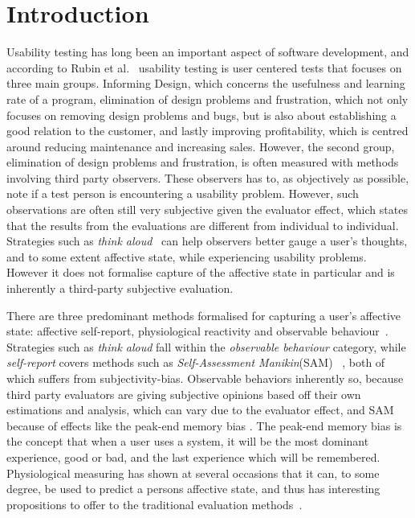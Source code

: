 
\section{Introduction}

Usability testing has long been an important aspect of software development, and according to Rubin et al.~\cite{rubin2008handbook} usability testing is user centered tests that focuses on three main groups.
Informing Design, which concerns the usefulness and learning rate of a program,
elimination of design problems and frustration, which not only focuses on removing design problems and bugs, but is also about establishing a good relation to the customer, and lastly improving profitability, which is centred around reducing maintenance and increasing sales.
However, the second group, elimination of design problems and frustration, is often measured with methods involving third party observers.
These observers has to, as objectively as possible, note if a test person is encountering a usability problem.
However, such observations are often still very subjective given the evaluator effect\cite{eval_effect}, which states that the results from the evaluations are different from individual to individual.
Strategies such as \textit{think aloud}~\cite{use_of_TA_and_IDA} can help observers better gauge a user's
thoughts, and to some extent affective state, while experiencing usability problems. However it does
not formalise capture of the affective state in particular and is inherently a third-party
subjective evaluation. 

There are three predominant methods formalised for capturing a user's affective state: affective self-report, physiological reactivity and
observable behaviour~\cite{BRADLEY199449}. Strategies such as \textit{think
aloud} fall within the \textit{observable behaviour} category, while
\textit{self-report} covers methods such as \textit{Self-Assessment Manikin}(SAM)
~\cite{BRADLEY199449}, both of which suffers from subjectivity-bias.
Observable behaviors inherently so, because third party evaluators are giving subjective opinions based off their own estimations and analysis, which can vary due to the evaluator effect, and SAM because of effects like the peak-end memory bias \cite{cockburn_peakend}. The peak-end memory bias is the concept that when a user uses a system, it will be the most dominant experience, good or bad, and the last experience which will be remembered.
Physiological measuring has shown at several occasions that it can, to some degree, be used to predict a persons
affective state, and thus has interesting propositions to offer to the traditional evaluation methods~\cite{eeg_facial_expressions,fusion4,90_percent_eeg_emotion}.

